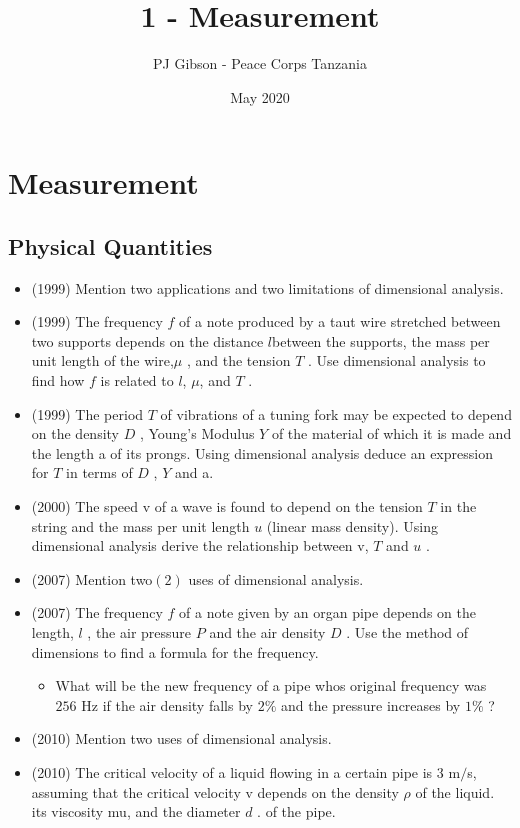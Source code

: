 \documentclass{article}
\title{\textbf{1 - Measurement}}
\author{PJ Gibson - Peace Corps Tanzania}
\date{May 2020}
\newcommand{\mysection}[2]{\setcounter{section}{#1}\addtocounter{section}{-1}\section{#2}}
\begin{document}
\maketitle


\mysection{1}{Measurement}

\subsection{Physical Quantities}
\begin{itemize}
\item (1999)  Mention two applications and two limitations of dimensional analysis.
\item (1999)  The frequency $ f$ of a note produced by a taut wire stretched between two supports depends on the distance ​ $ l$ ​ between the supports, the mass per unit length of the wire,$ \mu $ , and the tension $ T$ . Use dimensional analysis to find how $ f$ is related to ​ $ l$ ​ , $\mu$, and $ T$ .
\item (1999)  The period $ T$ of vibrations of a tuning fork may be expected to depend on the density $ D$ , Young's Modulus $ Y$ of the material of which it is made and the length a of its prongs. Using dimensional analysis deduce an expression for $ T$ in terms of $ D$ , $ Y$ and a.
\item (2000)  The speed v of a wave is found to depend on the tension $ T$ in the string and the mass per unit length $ u$ (linear mass density). Using dimensional analysis derive the relationship between v, $ T$ and $ u$ .
\item (2007)  Mention two$ (2)$ uses of dimensional analysis.
\item (2007)  The frequency $ f$ of a note given by an organ pipe depends on the length, $ l$ , the air pressure $ P$ and the air density $ D$ .  Use the method of dimensions to find a formula for the frequency.
 \begin{itemize}
\item What will be the new frequency of a pipe whos original frequency was $ 256$ Hz if the air density falls by $ 2\%$ and the pressure increases by $ 1\%$ ?
\end{itemize}
\item (2010)  Mention two uses of dimensional analysis.
\item (2010)  The critical velocity of a liquid flowing in a certain pipe is $ 3$ m$/$s, assuming that the critical velocity v depends on the density $ \rho $ of the liquid. its viscosity mu, and the diameter $ d$ . of the pipe. 

\end{itemize}
\end{document}
